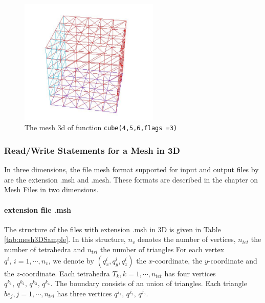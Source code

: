 \documentclass[a4paper,twoside,12pt]{book}
\begin{document}
\begin{figure}[htbp]
\begin{center}
  \includegraphics[height=6cm]{func-cube}
\end{center}
  \caption{The mesh 3d  of  function \texttt{cube(4,5,6,flags =3)}
  \label{fig:cube}} 
\end{figure}
\subsubsection{Read/Write Statements for a Mesh in 3D}

In three dimensions, the file mesh format supported for input and output files by \freefempp are the extension .msh and .mesh.
These formats are described in the chapter on Mesh Files in two dimensions.

\paragraph{extension file .msh}
The structure of the files with extension .msh in 3D is given in Table \ref{tab:mesh3DSample}.
In this structure, $n_v$ denotes the number of vertices, $n_{tet}$ the number of tetrahedra and $n_{tri}$ the number of triangles
For each vertex $q^i,\, i=1,\cdots,n_v$, we denote by $(q^i_x,q^i_y,q^i_z)$ the $x$-coordinate, the $y$-coordinate and the $z$-coordinate.
Each tetrahedra $T_k, k=1,\cdots,n_{tet}$ has four vertices $q^{k_1},\, q^{k_2},\,q^{k_3}, \,q^{k_4}$.
The boundary consists of an union of triangles. Each triangle $be_j, j=1,\cdots,n_{tri}$ has three vertices $q^{j_1},\, q^{j_2},\,q^{j_3}$.
\end{document}
